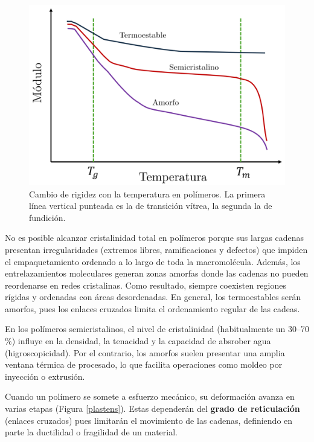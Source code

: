 \begin{figure}[h!]
    \centering
    \includegraphics[width=0.7\linewidth]{imgs/tgap.png}
    \caption{Cambio de rigidez con la temperatura en polímeros. La primera línea vertical punteada es la de transición vítrea, la segunda la de fundición.}
    \label{vitr}
\end{figure}

No es posible alcanzar cristalinidad total en polímeros porque sus largas cadenas presentan irregularidades (extremos libres, ramificaciones y defectos) que impiden el empaquetamiento ordenado a lo largo de toda la macromolécula. Además, los entrelazamientos moleculares generan zonas amorfas donde las cadenas no pueden reordenarse en redes cristalinas. Como resultado, siempre coexisten regiones rígidas y ordenadas con áreas desordenadas. En general, los termoestables serán amorfos, pues los enlaces cruzados limita el ordenamiento regular de las cadeas.

En los polímeros semicristalinos, el nivel de cristalinidad (habitualmente un 30–70$\%$) influye en la densidad, la tenacidad y la capacidad de absrober agua (higroscopicidad). Por el contrario, los amorfos suelen presentar una amplia ventana térmica de procesado, lo que facilita operaciones como moldeo por inyección o extrusión.

Cuando un polímero se somete a esfuerzo mecánico, su deformación avanza en varias etapas (Figura \ref{plastens}). Estas dependerán del \textbf{grado de reticulación} (enlaces cruzados) pues limitarán el movimiento de las cadenas, definiendo en parte la ductilidad o fragilidad de un material.

